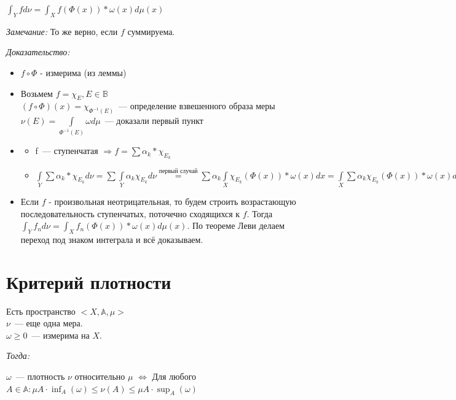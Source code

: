 \documentclass[paper=a4, fontsize=17pt]{article}
\begin{document}
		$\int_{Y}f d\nu = \int_{X} f(\Phi(x)) * \omega(x) d\mu(x)$

		\emph{Замечание:} То же верно, если $f$ суммируема.

		\emph{Доказательство:}

			\begin{itemize}
				\item $f\circ \Phi$ - измерима (из леммы)
				\item Возьмем $f = \chi_{E} , E\in \mathds{B}$ \\
				$(f\circ \Phi)(x) = \chi_{\Phi^{-1}(E)}$~--- определение взвешенного образа меры \\
				$\nu(E) = \int\limits_{\Phi^{-1}(E)}\omega d\mu$~--- доказали первый пункт
				\item
				\begin{itemize}
					\item f~--- ступенчатая $\Rightarrow f = \sum \alpha_k * \chi_{E_k}$
					\item $\int\limits_{Y} \sum \alpha_k * \chi_{E_k} d\nu = \sum \int\limits_{Y} \alpha_k \chi_{E_k} d\nu \overset{\textit{первый случай}}{=} \sum \alpha_k \int\limits_X \chi_{E_k}(\Phi(x))*\omega(x)dx = \int\limits_X \sum \alpha_k \chi_{E_k}(\Phi(x)) * \omega(x) d\mu(x) = \int f \circ \Phi * \omega d\mu$
				\end{itemize}
				\item Если $f$ - произвольная неотрицательная, то будем строить возрастающую последовательность ступенчатых, поточечно сходящихся к $f$. Тогда $\int_{Y}f_n d\nu = \int_{X} f_n(\Phi(x)) * \omega(x) d\mu(x)$. По теореме Леви делаем переход под знаком интеграла и всё доказываем.
			\end{itemize}
\section{Критерий плотности}
	Есть пространство $<X, \mathbb{A}, \mu>$ \\
	$\nu$~--- еще одна мера. \\
	$\omega \geq 0$~--- измерима на $X$.

	\emph{Тогда:}

	$\omega$~--- плотность $\nu$ относительно $\mu$ $\Longleftrightarrow$ Для любого $A\in\mathbb{A}:\mu A \cdot \inf_A(\omega) \leq \nu(A) \leq \mu A \cdot \sup_A(\omega)$
\end{document}
